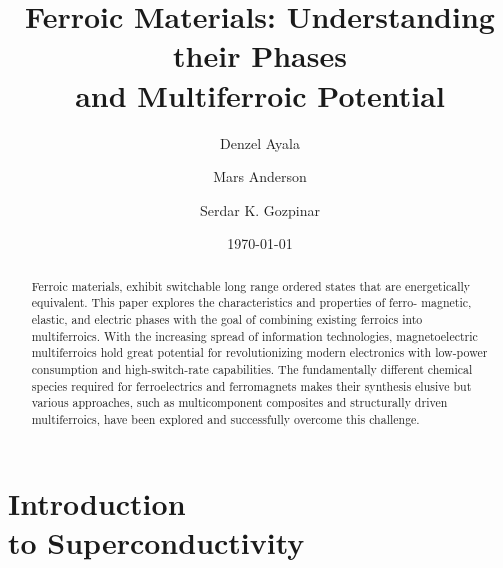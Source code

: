 \documentclass[
reprint,
amsmath,amssymb,
aps,
tikz,
border=5pt
]{revtex4-1}
\begin{document}

\title{Ferroic Materials: Understanding their Phases\\ and Multiferroic Potential}

\author{Denzel Ayala} 
\author{Mars Anderson}
\author{Serdar K. Gozpinar}

%


\date{\today}%

\begin{abstract}

  Ferroic materials, exhibit switchable long range ordered states that are energetically equivalent. This paper explores the characteristics and properties of ferro- magnetic, elastic, and electric phases with the goal of combining existing ferroics into multiferroics. With  the increasing spread of information technologies, magnetoelectric multiferroics hold great potential for revolutionizing modern electronics with low-power consumption and high-switch-rate capabilities. The fundamentally different chemical species required for ferroelectrics and ferromagnets makes their synthesis elusive but various approaches, such as multicomponent composites and structurally driven multiferroics, have been explored and successfully overcome this challenge.
\end{abstract}
\maketitle

\section*{\label{sec:intro}Introduction \\\lowercase{to} Superconductivity}
\end{document}

